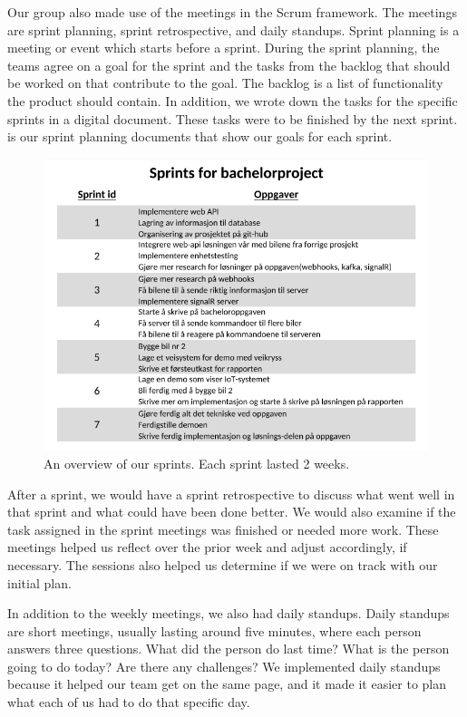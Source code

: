 Our group also made use of the meetings in the Scrum framework. The meetings are sprint planning, sprint retrospective, and daily standups. Sprint planning is a meeting or event which starts before a sprint. During the sprint planning, the teams agree on a goal for the sprint and the tasks from the backlog that should be worked on that contribute to the goal. The backlog is a list of functionality the product should contain. In addition, we wrote down the tasks for the specific sprints in a digital document. These tasks were to be finished by the next sprint.  is our sprint planning documents that show our goals for each sprint.

\begin{figure}[h!]
	\centering
	\includegraphics[width=1\linewidth]{figures/Sprint_overview}
	\caption[Sprint overview]{An overview of our sprints. Each sprint lasted 2 weeks.}
	\label{fig:sprintoverview}
\end{figure}

After a sprint, we would have a sprint retrospective to discuss what went well in that sprint and what could have been done better. We would also examine if the task assigned in the sprint meetings was finished or needed more work. These meetings helped us reflect over the prior week and adjust accordingly, if necessary. The sessions also helped us determine if we were on track with our initial plan. 
 
In addition to the weekly meetings, we also had daily standups. Daily standups are short meetings, usually lasting around five minutes, where each person answers three questions. What did the person do last time? What is the person going to do today? Are there any challenges? We implemented daily standups because it helped our team get on the same page, and it made it easier to plan what each of us had to do that specific day.

